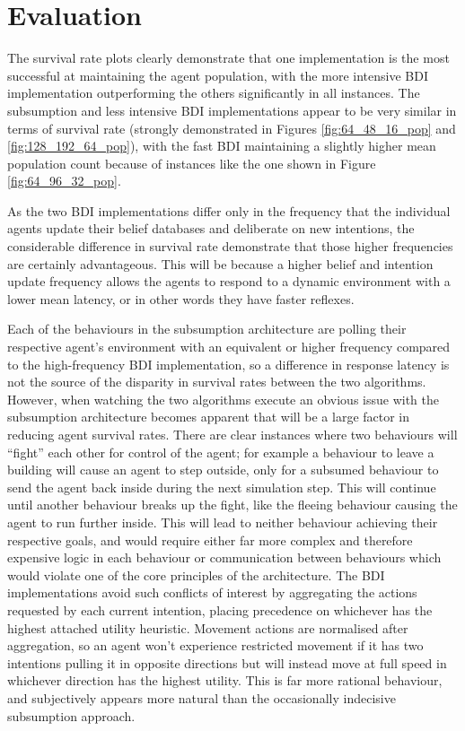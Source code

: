 \documentclass[a4paper,12pt]{article}
\begin{document}
\newpage
\section{Evaluation}
\noindent
The survival rate plots clearly demonstrate that one implementation is the most successful at maintaining the agent population, with the more intensive BDI implementation outperforming the others significantly in all instances. The subsumption and less intensive BDI implementations appear to be very similar in terms of survival rate (strongly demonstrated in Figures \ref{fig:64_48_16_pop} and \ref{fig:128_192_64_pop}), with the fast BDI maintaining a slightly higher mean population count because of instances like the one shown in Figure \ref{fig:64_96_32_pop}.

As the two BDI implementations differ only in the frequency that the individual agents update their belief databases and deliberate on new intentions, the considerable difference in survival rate demonstrate that those higher frequencies are certainly advantageous. This will be because a higher belief and intention update frequency allows the agents to respond to a dynamic environment with a lower mean latency, or in other words they have faster reflexes.

Each of the behaviours in the subsumption architecture are polling their respective agent's environment with an equivalent or higher frequency compared to the high-frequency BDI implementation, so a difference in response latency is not the source of the disparity in survival rates between the two algorithms. However, when watching the two algorithms execute an obvious issue with the subsumption architecture becomes apparent that will be a large factor in reducing agent survival rates. There are clear instances where two behaviours will ``fight'' each other for control of the agent; for example a behaviour to leave a building will cause an agent to step outside, only for a subsumed behaviour to send the agent back inside during the next simulation step. This will continue until another behaviour breaks up the fight, like the fleeing behaviour causing the agent to run further inside. This will lead to neither behaviour achieving their respective goals, and would require either far more complex and therefore expensive logic in each behaviour or communication between behaviours which would violate one of the core principles of the architecture. The BDI implementations avoid such conflicts of interest by aggregating the actions requested by each current intention, placing precedence on whichever has the highest attached utility heuristic. Movement actions are normalised after aggregation, so an agent won't experience restricted movement if it has two intentions pulling it in opposite directions but will instead move at full speed in whichever direction has the highest utility. This is far more rational behaviour, and subjectively appears more natural than the occasionally indecisive subsumption approach.
\end{document}
